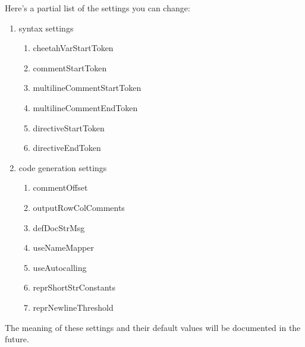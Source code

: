 Here's a partial list of the settings you can change:
\begin{enumerate}
\item syntax settings
     \begin{enumerate}
     \item cheetahVarStartToken
     \item commentStartToken
     \item multilineCommentStartToken
     \item multilineCommentEndToken
     \item directiveStartToken
     \item directiveEndToken
     \end{enumerate}
\item code generation settings
     \begin{enumerate}
     \item commentOffset
     \item outputRowColComments
     \item defDocStrMsg

     \item useNameMapper
     \item useAutocalling
     \item reprShortStrConstants
     \item reprNewlineThreshold
     \end{enumerate}
\end{enumerate}
The meaning of these settings and their default values will be documented in the future.






